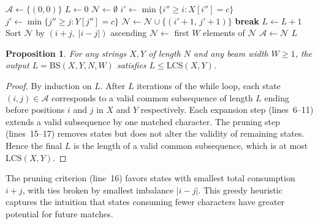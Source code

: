 \documentclass[11pt,a4paper]{article}
\newtheorem{proposition}[theorem]{Proposition}
\theoremstyle{definition}
\newcommand{\LCS}{\mathrm{LCS}}
\newcommand{\BS}{\mathrm{BS}}
\begin{document}
\begin{algorithm}[t]
  \caption{$\BS(X, Y, N, W)$: Beam-search LCS heuristic}
  \label{alg:beam_search}
  \begin{algorithmic}[1]
    \State $\mathcal{A} \gets \{(0, 0)\}$ 
    \State $L \gets 0$ 
      \State $\mathcal{N} \gets \emptyset$ 
          \State $i' \gets \min\{i'' \geq i : X[i''] = c\}$
          \State $j' \gets \min\{j'' \geq j : Y[j''] = c\}$
            \State $\mathcal{N} \gets \mathcal{N} \cup \{(i'+1,\, j'+1)\}$
          \EndIf
        \EndFor
      \EndFor
       \textbf{break} \EndIf
      \State $L \gets L + 1$
       
        \State Sort $\mathcal{N}$ by $(i+j,\; |i-j|)$ ascending
        \State $\mathcal{N} \gets$ first $W$ elements of $\mathcal{N}$
      \EndIf
      \State $\mathcal{A} \gets \mathcal{N}$
    \EndWhile
    \State \Return $L$
  \end{algorithmic}
\end{algorithm}

\begin{proposition}
  \label{prop:valid_subsequence}
  For any strings $X, Y$ of length $N$ and any beam width $W \geq 1$, the
  output $L = \BS(X, Y, N, W)$ satisfies $L \leq \LCS(X, Y)$.
\end{proposition}

\begin{proof}
  By induction on $L$. After $L$ iterations of the while loop, each state
  $(i, j) \in \mathcal{A}$ corresponds to a valid common subsequence of length
  $L$ ending before positions $i$ and $j$ in $X$ and $Y$ respectively. Each
  expansion step (lines~6--11) extends a valid subsequence by one matched
  character. The pruning step (lines~15--17) removes states but does not alter
  the validity of remaining states. Hence the final $L$ is the length of a valid
  common subsequence, which is at most $\LCS(X, Y)$.
\end{proof}

The pruning criterion (line~16) favors states with smallest total consumption
$i + j$, with ties broken by smallest imbalance $|i - j|$. This greedy
heuristic captures the intuition that states consuming fewer characters have
greater potential for future matches.
\end{document}
